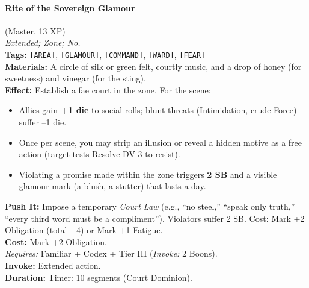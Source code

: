 \paragraph{Rite of the Sovereign Glamour} (Master, 13 XP) \hfill \\
\emph{Extended; Zone; No.} \\
\textbf{Tags:} \texttt{[AREA]}, \texttt{[GLAMOUR]}, \texttt{[COMMAND]}, \texttt{[WARD]}, \texttt{[FEAR]} \\
\textbf{Materials:} A circle of silk or green felt, courtly music, and a drop of honey (for sweetness) and vinegar (for the sting). \\
\textbf{Effect:} Establish a fae court in the zone. For the scene:
\begin{itemize}
  \item Allies gain \textbf{+1 die} to social rolls; blunt threats (Intimidation, crude Force) suffer --1 die.
  \item Once per scene, you may strip an illusion or reveal a hidden motive as a free action (target tests Resolve DV 3 to resist).
  \item Violating a promise made within the zone triggers \textbf{2 SB} and a visible glamour mark (a blush, a stutter) that lasts a day.
\end{itemize}
\textbf{Push It:} Impose a temporary \textit{Court Law} (e.g., ``no steel,'' ``speak only truth,'' ``every third word must be a compliment''). Violators suffer 2 SB. Cost: Mark +2 Obligation (total +4) or Mark +1 Fatigue. \\
\textbf{Cost:} Mark +2 Obligation. \\
\textit{Requires:} Familiar + Codex + Tier III (\textit{Invoke:} 2 Boons). \\
\textbf{Invoke:} Extended action. \\
\textbf{Duration:} Timer: 10 segments (Court Dominion).

